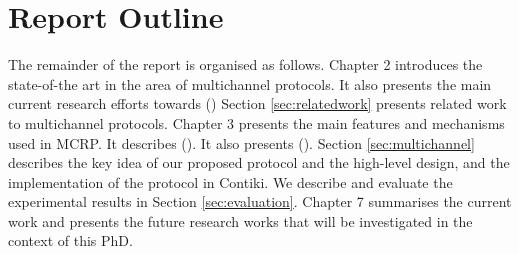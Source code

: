 \section{Report Outline}
The remainder of the report is organised as follows. Chapter 2 introduces the state-of-the art in the area of multichannel protocols. It also presents the main current research efforts towards () Section \ref{sec:relatedwork} presents related work to multichannel protocols. Chapter 3 presents the main features and mechanisms used in MCRP. It describes (). It also presents (). Section \ref{sec:multichannel} describes the key idea of our proposed protocol and the high-level design, and the implementation of the protocol in Contiki. We describe and evaluate the experimental results in Section \ref{sec:evaluation}. Chapter 7 summarises the current work and presents the future research works that will be investigated in the context of this PhD.